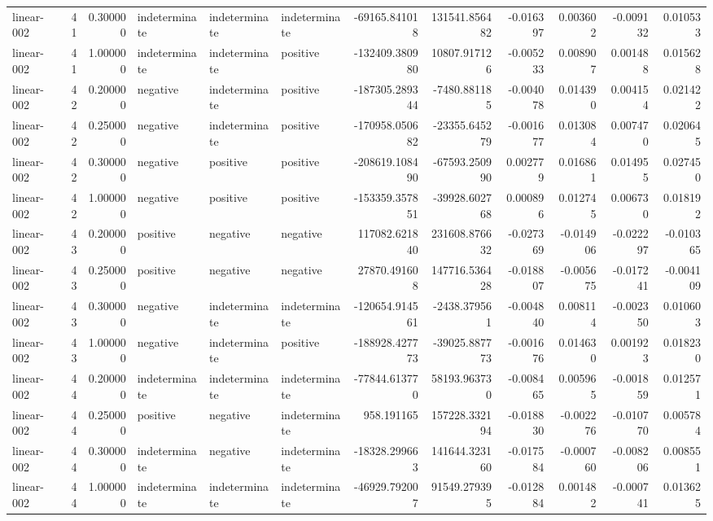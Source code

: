 \begin{tabular}{lrrlllrrrrrr}
linear-002 & 41 & 0.300000 & indeterminate & indeterminate & indeterminate & -69165.841018 & 131541.856482 & -0.016397 & 0.003602 & -0.009132 & 0.010533 \\
linear-002 & 41 & 1.000000 & indeterminate & indeterminate & positive & -132409.380980 & 10807.917126 & -0.005233 & 0.008907 & 0.001488 & 0.015628 \\
linear-002 & 42 & 0.200000 & negative & indeterminate & positive & -187305.289344 & -7480.881185 & -0.004078 & 0.014390 & 0.004154 & 0.021422 \\
linear-002 & 42 & 0.250000 & negative & indeterminate & positive & -170958.050682 & -23355.645279 & -0.001677 & 0.013084 & 0.007470 & 0.020645 \\
linear-002 & 42 & 0.300000 & negative & positive & positive & -208619.108490 & -67593.250990 & 0.002779 & 0.016861 & 0.014955 & 0.027450 \\
linear-002 & 42 & 1.000000 & negative & positive & positive & -153359.357851 & -39928.602768 & 0.000896 & 0.012745 & 0.006730 & 0.018192 \\
linear-002 & 43 & 0.200000 & positive & negative & negative & 117082.621840 & 231608.876632 & -0.027369 & -0.014906 & -0.022297 & -0.010365 \\
linear-002 & 43 & 0.250000 & positive & negative & negative & 27870.491608 & 147716.536428 & -0.018807 & -0.005675 & -0.017241 & -0.004109 \\
linear-002 & 43 & 0.300000 & negative & indeterminate & indeterminate & -120654.914561 & -2438.379561 & -0.004840 & 0.008114 & -0.002350 & 0.010603 \\
linear-002 & 43 & 1.000000 & negative & indeterminate & positive & -188928.427773 & -39025.887773 & -0.001676 & 0.014630 & 0.001923 & 0.018230 \\
linear-002 & 44 & 0.200000 & indeterminate & indeterminate & indeterminate & -77844.613770 & 58193.963730 & -0.008465 & 0.005965 & -0.001859 & 0.012571 \\
linear-002 & 44 & 0.250000 & positive & negative & indeterminate & 958.191165 & 157228.332194 & -0.018830 & -0.002276 & -0.010770 & 0.005784 \\
linear-002 & 44 & 0.300000 & indeterminate & negative & indeterminate & -18328.299663 & 141644.323160 & -0.017584 & -0.000760 & -0.008206 & 0.008551 \\
linear-002 & 44 & 1.000000 & indeterminate & indeterminate & indeterminate & -46929.792007 & 91549.279395 & -0.012884 & 0.001482 & -0.000741 & 0.013625 \\

\end{tabular}
